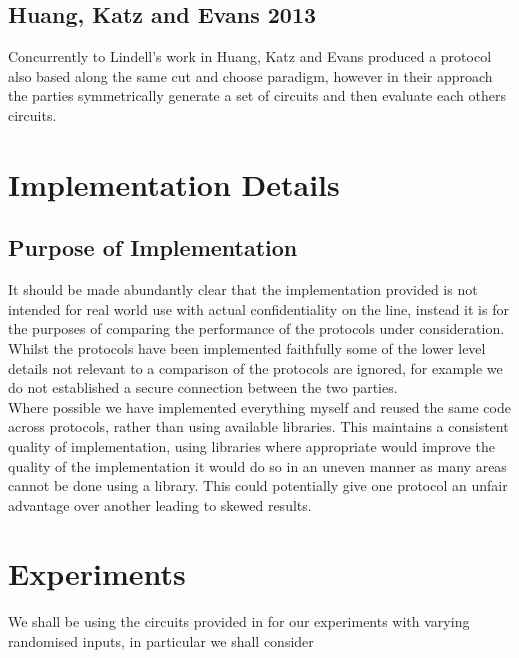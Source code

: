 \documentclass[a4paper,11pt]{article}
\begin{document}
		\subsection{Huang, Katz and Evans 2013}
			Concurrently to Lindell's work in \cite{Lindell_CnC_2013} Huang, Katz and Evans produced a protocol also based along the same cut and choose paradigm, however in their approach the parties symmetrically generate a set of circuits and then evaluate each others circuits.

	\section{Implementation Details} \label{sec:ImplementationDetails}
		\subsection{Purpose of Implementation}
			It should be made abundantly clear that the implementation provided is not intended for real world use with actual confidentiality on the line, instead it is for the purposes of comparing the performance of the protocols under consideration. Whilst the protocols have been implemented faithfully some of the lower level details not relevant to a comparison of the protocols are ignored, for example we do not established a secure connection between the two parties.\\

			Where possible we have implemented everything myself and reused the same code across protocols, rather than using available libraries. This maintains a consistent quality of implementation, using libraries where appropriate would improve the quality of the implementation it would do so in an uneven manner as many areas cannot be done using a library. This could potentially give one protocol an unfair advantage over another leading to skewed results.\\



	\section{Experiments} \label{sec:Results}
		We shall be using the circuits provided in \cite{NigelCircuits} for our experiments with varying randomised inputs, in particular we shall consider
		
\end{document}
